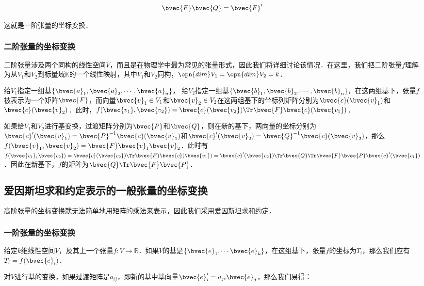 \begin{equation}
\bvec{F}\bvec{Q}=\bvec{F}'
\end{equation}

这就是一阶张量的坐标变换．
\subsubsection{二阶张量的坐标变换}

二阶张量涉及两个同构的线性空间$V$，而且是在物理学中最为常见的张量形式，因此我们将详细讨论该情况．在这里，我们把二阶张量$f$理解为从$V_1$和$V_2$到标量域$\mathbb{K}$的一个线性映射，其中$V_1$和$V_2$同构，$\opn{dim}V_1=\opn{dim}V_2=k$．

给$V_1$指定一组基$\{\bvec{a}_1, \bvec{a}_2, \cdots, \bvec{a}_n\}$， 给$V_2$指定一组基$\{\bvec{b}_1, \bvec{b}_2, \cdots, \bvec{b}_n\}$，在这两组基下，张量$f$被表示为一个矩阵$\bvec{F}$，而向量$\bvec{v}_1\in V_1$和$\bvec{v}_2\in V_2$在这两组基下的坐标列矩阵分别为$\bvec{c}(\bvec{v}_1)$和$\bvec{c}(\bvec{v}_2)$．此时，$f(\bvec{v_1},\bvec{v_2})=\bvec{c}(\bvec{v_2})\Tr\bvec{F}\bvec{c}(\bvec{v_1})$．

如果给$V_1$和$V_2$进行基变换，过渡矩阵分别为$\bvec{P}$和$\bvec{Q}$，则在新的基下，两向量的坐标分别为$\bvec{c}'(\bvec{v}_1)=\bvec{P}^{-1}\bvec{c}(\bvec{v}_1)$和$\bvec{c}'(\bvec{v}_2)=\bvec{Q}^{-1}\bvec{c}(\bvec{v}_2)$，那么$f(\bvec{v}_1, \bvec{v}_2)=\bvec{F}\bvec{v}_1\bvec{v}_2$．此时有$f(\bvec{v_1},\bvec{v_2})=\bvec{c}(\bvec{v_2})\Tr\bvec{F}\bvec{c}(\bvec{v_1})=\bvec{c}'(\bvec{v_2})\Tr\bvec{Q}\Tr\bvec{F}\bvec{P}\bvec{c}'(\bvec{v_1})$．因此在新基下，$f$的矩阵为$\bvec{Q}\Tr\bvec{F}\bvec{P}$．



\subsection{爱因斯坦求和约定表示的一般张量的坐标变换}

高阶张量的坐标变换就无法简单地用矩阵的乘法来表示，因此我们采用爱因斯坦求和约定．

\subsubsection{一阶张量的坐标变换}

给定$k$维线性空间$V$，及其上一个张量$f:V\rightarrow\mathbb{R}$．如果$V$的基是$\{\bvec{e}_1, \cdots\bvec{e}_k\}$，在这组基下，张量$f$的坐标为$T_{i}$，那么我们应有$T_{i}=f(\bvec{e}_i)$．

对$V$进行基的变换，如果过渡矩阵是$a_{ij}$，即新的基中基向量$\bvec{e}'_{i}=a_{ji}\bvec{e}_j$，那么我们易得：

